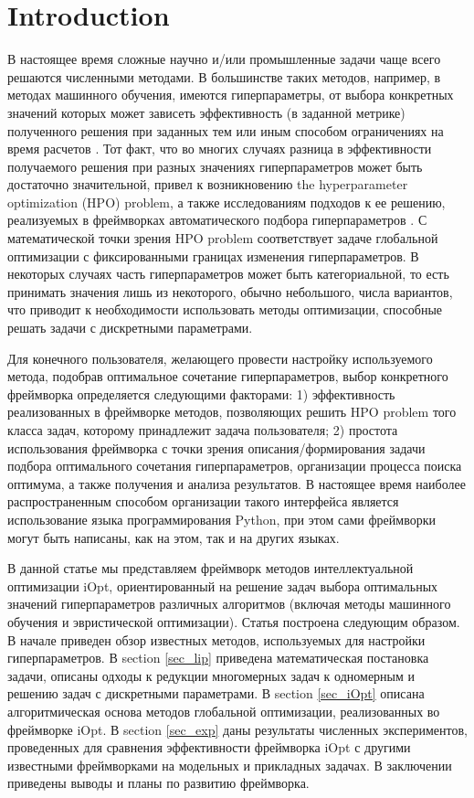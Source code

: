 \documentclass[preprint,12pt]{elsarticle}
\begin{document}
\linenumbers

\section{Introduction}
\label{sec_intro}

В настоящее время сложные научно и/или промышленные задачи чаще всего решаются численными методами. В большинстве таких методов, например, в методах машинного обучения, имеются гиперпараметры, от выбора конкретных значений которых может зависеть эффективность (в заданной метрике) полученного решения при заданных тем или иным способом ограничениях на время расчетов \cite{Hutter2019}. Тот факт, что во многих случаях разница в эффективности получаемого решения при разных значениях гиперпараметров может быть достаточно значительной, привел к возникновению the hyperparameter optimization (HPO) problem, а также исследованиям подходов к ее решению, реализуемых в фреймворках автоматического подбора гиперпараметров \cite{Tune, optuna, hyperopt,Sherpa}. С математической точки зрения HPO problem соответствует задаче глобальной оптимизации с фиксированными границах изменения гиперпараметров. В некоторых случаях часть гиперпараметров может быть категориальной, то есть принимать значения лишь из некоторого, обычно небольшого, числа вариантов, что приводит к необходимости использовать методы оптимизации, способные решать задачи с дискретными параметрами.

Для конечного пользователя, желающего провести настройку используемого метода, подобрав оптимальное сочетание гиперпараметров, выбор конкретного фреймворка определяется следующими факторами: 1) эффективность реализованных в фреймворке методов, позволяющих решить HPO problem того класса задач, которому принадлежит задача пользователя; 2) простота использования фреймворка с точки зрения описания/формирования задачи подбора оптимального сочетания гиперпараметров, организации процесса поиска оптимума, а также получения и анализа результатов. В настоящее время наиболее распространенным способом организации такого интерфейса является использование языка программирования Python, при этом сами фреймворки могут быть написаны, как на этом, так и на других языках.

В данной статье мы представляем фреймворк методов интеллектуальной оптимизации iOpt, ориентированный на решение задач выбора оптимальных значений гиперпараметров различных алгоритмов (включая методы машинного обучения и эвристической оптимизации). Статья построена следующим образом. В начале приведен обзор известных методов, используемых для настройки гиперпараметров. В section \ref{sec_lip} приведена математическая постановка задачи, описаны одходы к редукции многомерных задач к одномерным и решению задач с дискретными параметрами. В section \ref{sec_iOpt} описана алгоритмическая основа методов глобальной оптимизации, реализованных во фреймворке iOpt. В section \ref{sec_exp} даны результаты численных экспериментов, проведенных для сравнения эффективности фреймворка iOpt с другими известными фреймворками на модельных и прикладных задачах. В заключении приведены выводы и планы по развитию фреймворка.
\end{document}
